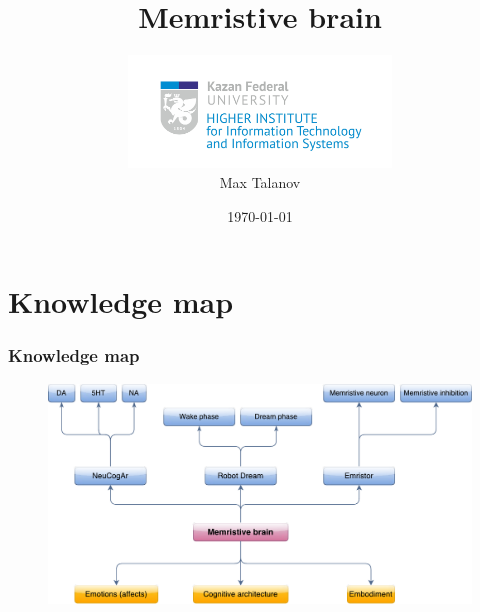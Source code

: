 \documentclass[12pt, aspectratio=169]{beamer}
\title[Memristive brain]{Memristive brain} %
\author[Max Talanov]{
  \includegraphics[height=3cm]{ITIS_logo_bright}\\
  Max Talanov
}
\institute[ITIS: KFU] %
{
Machine cognition lab, Intellectual robotics department, ITIS \\ %
\medskip
\textit{max.talanov@gmail.com} %
}
\date{\today} %
\begin{document}
\begin{frame}
\titlepage %
\end{frame}


\section{Knowledge map}

\begin{frame}
\frametitle{Knowledge map}
\begin{figure}
\includegraphics[width=0.7\linewidth]{knowledge_map}
\end{figure}
\end{frame}

\end{document}
